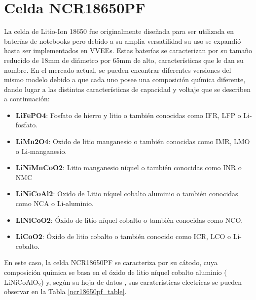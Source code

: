 \documentclass[10pt, a4paper]{report}
\begin{document}
\section{Celda NCR18650PF} \label{seq:cel_selection}

La celda de Litio-Ion 18650 fue originalmente diseñada para ser utilizada en
bater\'ias de notebooks pero debido a su amplia versatilidad su uso se
expandi\'o hasta ser implementados en \acrshort{VVEE}s. Estas bater\'ias se
caracterizan por su tamaño reducido de 18mm de di\'ametro por 65mm de alto,
características que le dan su nombre. En el mercado actual, se pueden encontrar
diferentes versiones del mismo modelo debido a que cada uno posee una
composici\'on qu\'imica diferente, dando lugar a las distintas caracter\'isticas
de capacidad y voltaje que se describen a continuaci\'on:

\begin{itemize}
    \item \textbf{LiFePO4}: Fosfato de hierro y litio o tambi\'en conocidas como
        IFR, LFP o Li-fosfato.
    \item \textbf{LiMn2O4}: Oxido de litio manganesio o tambi\'en conocidas como
        IMR, LMO o Li-manganesio.
    \item \textbf{LiNiMnCoO2}: Litio manganesio n\'iquel o tambi\'en conocidas como
        INR o NMC
    \item \textbf{LiNiCoAl2}: Oxido de Litio n\'iquel cobalto aluminio o
        tambi\'en conocidas como NCA o Li-aluminio.
    \item \textbf{LiNiCoO2}: \'Oxido de litio n\'iquel cobalto o tambi\'en
        conocidas como NCO.
    \item \textbf{LiCoO2}: \'Oxido de litio cobalto o tambi\'en conocido como
        ICR, LCO o Li-cobalto.
\end{itemize}

En este caso, la celda NCR18650PF se caracteriza por su cátodo, cuya composición 
química se basa en el óxido de litio níquel cobalto aluminio 
($\mathrm{LiNiCoAlO_2}$) y, según su hoja de datos \cite{18650pf}, sus 
carateristicas electricas se pueden observar en la Tabla \ref{ncr18650pf_table}.
\end{document}
